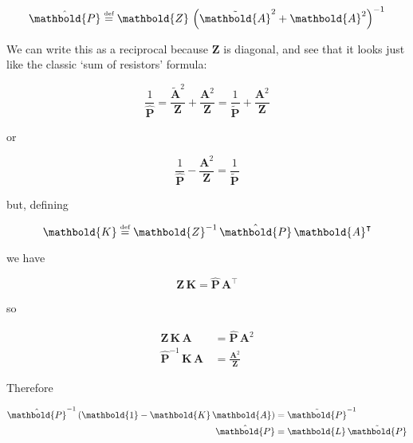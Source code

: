 \documentclass[10pt,oneside,x11names]{article}
\begin{document}
\begin{equation}
\label{eqn:new-p-hat-definition}
{\hat{\mathbold{P}}}
\stackrel{\text{\tiny def}}{=}
\mathbold{Z}\,
\left(
{\tilde{\mathbold{A}}}^2 + \mathbold{A}^2
\right)^{-1}
\end{equation}

\noindent We can write this as a reciprocal because \(\mathbold{Z}\) is diagonal, and see that it looks
just like the classic `sum of resistors' formula:

\begin{equation*}
\frac{1}{\hat{\mathbold{P}}}
=
\frac{{\tilde{\mathbold{A}}}^2}{\mathbold{Z}} + 
\frac{\mathbold{A}^2}{\mathbold{Z}}
=
\frac{1}{\tilde{\mathbold{P}}} + 
\frac{\mathbold{A}^2}{\mathbold{Z}}
\end{equation*}

\noindent or

\begin{equation*}
\frac{1}{\hat{\mathbold{P}}} -
\frac{\mathbold{A}^2}{\mathbold{Z}}
=
\frac{1}{\tilde{\mathbold{P}}} 
\end{equation*}


\noindent but, defining

\begin{equation}
\label{eqn:kalman-gain-new-definition}
\mathbold{K}
\stackrel{\text{\tiny def}}{=}
\mathbold{Z}^{-1}\,
{\hat{\mathbold{P}}}\,
\mathbold{A}^\intercal
\end{equation}

\noindent we have

\begin{equation*}
\mathbold{Z}\,
\mathbold{K} =
{\hat{\mathbold{P}}}\,
\mathbold{A}^\intercal
\end{equation*}

\noindent so

\begin{align*}
\mathbold{Z}\,
\mathbold{K}\,
\mathbold{A} &=
{\hat{\mathbold{P}}}\,
\mathbold{A}^2
\\
{\hat{\mathbold{P}}}^{-1}\,
\mathbold{K}\,
\mathbold{A}\,
&=
\frac{\mathbold{A}^2}{\mathbold{Z}}
\end{align*}

\noindent Therefore

\begin{align}
\notag
{\hat{\mathbold{P}}}^{-1}\,
(
\mathbold{1}-
\mathbold{K}\,
\mathbold{A}
)
&=
{\tilde{\mathbold{P}}}^{-1} 
\\
\label{eqn:derivation-of-p-is-l-p}
{\hat{\mathbold{P}}} &=
\mathbold{L}\,
{\tilde{\mathbold{P}}}
\end{align}
\end{document}
